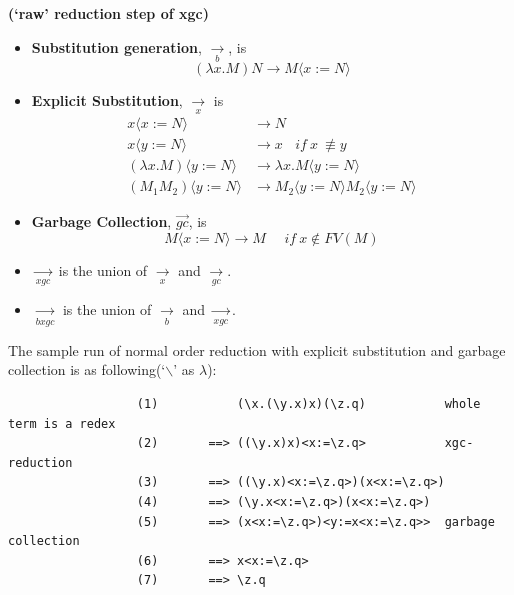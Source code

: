 \begin{def1}
\normalfont \textbf{(`raw' reduction step of xgc)}
\end{def1}

\begin{itemize}
\item \textbf{Substitution generation}, $\xrightarrow[b]{}$, is 
\begin{equation}
\tag{b}
(\lambda x.M)N \rightarrow M\langle x:=N\rangle
\end{equation}
\item \textbf{Explicit Substitution}, $\xrightarrow[x]{}$ is
\begin{align*} 
\tag{xv} x\langle x:=N\rangle & \rightarrow N \\
\tag{xvgc} x\langle y:=N\rangle & \rightarrow x \ \ \ \ if\ x\ \not\equiv y \\
\tag{xab} (\lambda x.M)\langle y:=N\rangle & \rightarrow \lambda x.M\langle y:=N\rangle \\
\tag{xap} (M_1M_2)\langle y:=N\rangle & \rightarrow M_2\langle y:=N\rangle M_2\langle y:=N\rangle
\end{align*}
\item \textbf{Garbage Collection}, $\overrightarrow{gc}$, is
\begin{equation}
\tag{gc}
M\langle x:=N\rangle \rightarrow M\ \ \ \ \ \ if\ x\notin FV(M)
\end{equation}
\item $\xrightarrow[xgc]{}$ is the union of $\xrightarrow[x]{}$ and $\xrightarrow[gc]{}$.
\item $\xrightarrow[bxgc]{}$ is the union of $\xrightarrow[b]{}$ and $\xrightarrow[xgc]{}$.
\end{itemize}


\begin{exmp}
\normalfont The sample run of normal order reduction with explicit substitution and garbage collection is as following(`$\backslash$' as $\lambda$):
\end{exmp}
\begin{verbatim}
                  (1)           (\x.(\y.x)x)(\z.q)           whole term is a redex
                  (2)       ==> ((\y.x)x)<x:=\z.q>           xgc-reduction
                  (3)       ==> ((\y.x)<x:=\z.q>)(x<x:=\z.q>)
                  (4)       ==> (\y.x<x:=\z.q>)(x<x:=\z.q>)
                  (5)       ==> (x<x:=\z.q>)<y:=x<x:=\z.q>>  garbage collection
                  (6)       ==> x<x:=\z.q>
                  (7)       ==> \z.q          
\end{verbatim}

